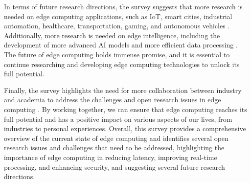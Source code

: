 \documentclass[11pt]{article}
\begin{document}
In terms of future research directions, the survey suggests that more research is needed on edge computing applications, such as IoT, smart cities, industrial automation, healthcare, transportation, gaming, and autonomous vehicles \cite{ref4}. Additionally, more research is needed on edge intelligence, including the development of more advanced AI models and more efficient data processing \cite{ref82}. The future of edge computing holds immense promise, and it is essential to continue researching and developing edge computing technologies to unlock its full potential.

Finally, the survey highlights the need for more collaboration between industry and academia to address the challenges and open research issues in edge computing \cite{ref83}. By working together, we can ensure that edge computing reaches its full potential and has a positive impact on various aspects of our lives, from industries to personal experiences. Overall, this survey provides a comprehensive overview of the current state of edge computing and identifies several open research issues and challenges that need to be addressed, highlighting the importance of edge computing in reducing latency, improving real-time processing, and enhancing security, and suggesting several future research directions.
\end{document}
